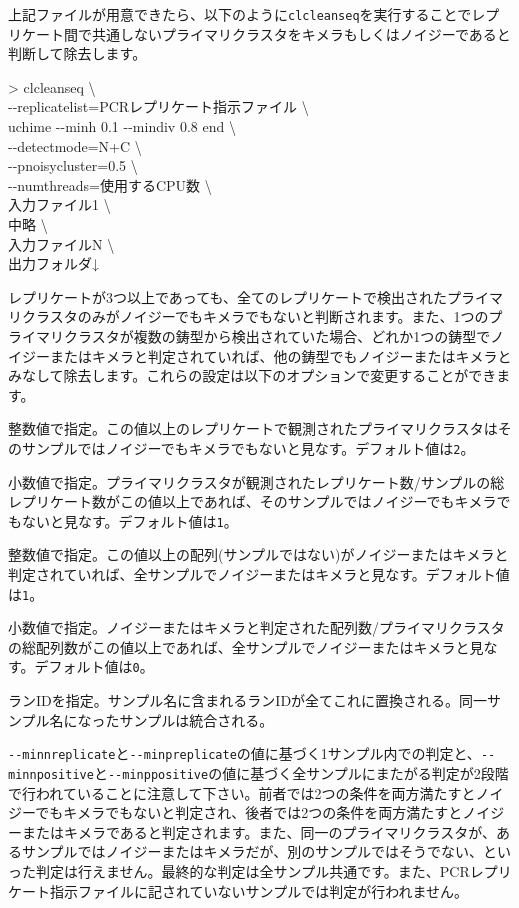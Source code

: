 \documentclass[titlepage,10pt,a4paper]{jsbook}
\newenvironment{cmd}{\begin{oframed}\raggedright\ttfamily\footnotesize\setlength{\baselineskip}{1.4em}}{\end{oframed}\vspace{-1em}}
\begin{document}
上記ファイルが用意できたら、以下のように\texttt{clcleanseq}を実行することでレプリケート間で共通しないプライマリクラスタをキメラもしくはノイジーであると判断して除去します。
\begin{cmd}
{\textgreater} clcleanseq {\textbackslash}\\
{-}{-}replicatelist=PCRレプリケート指示ファイル {\textbackslash}\\
uchime {-}{-}minh 0.1 {-}{-}mindiv 0.8 end {\textbackslash}\\
{-}{-}detectmode=N+C {\textbackslash}\\
{-}{-}pnoisycluster=0.5 {\textbackslash}\\
{-}{-}numthreads=使用するCPU数 {\textbackslash}\\
入力ファイル1 {\textbackslash}\\
中略 {\textbackslash}\\
入力ファイルN {\textbackslash}\\
出力フォルダ↓
\end{cmd}
レプリケートが3つ以上であっても、全てのレプリケートで検出されたプライマリクラスタのみがノイジーでもキメラでもないと判断されます。また、1つのプライマリクラスタが複数の鋳型から検出されていた場合、どれか1つの鋳型でノイジーまたはキメラと判定されていれば、他の鋳型でもノイジーまたはキメラとみなして除去します。これらの設定は以下のオプションで変更することができます。
\begin{description}\small\setlength{\baselineskip}{1.1em}
\item[\texttt{{-}{-}minnreplicate}] 整数値で指定。この値以上のレプリケートで観測されたプライマリクラスタはそのサンプルではノイジーでもキメラでもないと見なす。デフォルト値は\texttt{2}。
\item[\texttt{{-}{-}minpreplicate}] 小数値で指定。プライマリクラスタが観測されたレプリケート数/サンプルの総レプリケート数がこの値以上であれば、そのサンプルではノイジーでもキメラでもないと見なす。デフォルト値は\texttt{1}。
\item[\texttt{{-}{-}minnpositive}] 整数値で指定。この値以上の配列(サンプルではない)がノイジーまたはキメラと判定されていれば、全サンプルでノイジーまたはキメラと見なす。デフォルト値は\texttt{1}。
\item[\texttt{{-}{-}minppositive}] 小数値で指定。ノイジーまたはキメラと判定された配列数/プライマリクラスタの総配列数がこの値以上であれば、全サンプルでノイジーまたはキメラと見なす。デフォルト値は\texttt{0}。
\item[\texttt{{-}{-}runname}] ランIDを指定。サンプル名に含まれるランIDが全てこれに置換される。同一サンプル名になったサンプルは統合される。
\end{description}
\texttt{{-}{-}minnreplicate}と\texttt{{-}{-}minpreplicate}の値に基づく1サンプル内での判定と、\texttt{{-}{-}minnpositive}と\texttt{{-}{-}minppositive}の値に基づく全サンプルにまたがる判定が2段階で行われていることに注意して下さい。前者では2つの条件を両方満たすとノイジーでもキメラでもないと判定され、後者では2つの条件を両方満たすとノイジーまたはキメラであると判定されます。また、同一のプライマリクラスタが、あるサンプルではノイジーまたはキメラだが、別のサンプルではそうでない、といった判定は行えません。最終的な判定は全サンプル共通です。また、PCRレプリケート指示ファイルに記されていないサンプルでは判定が行われません。
\end{document}
